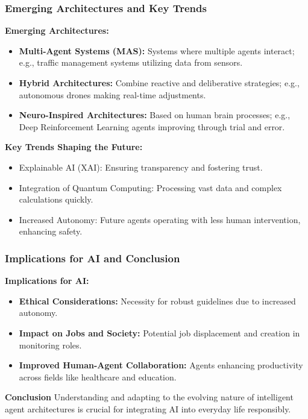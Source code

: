 \documentclass[aspectratio=169]{beamer}
\begin{document}
\begin{frame}[fragile]
    \frametitle{Emerging Architectures and Key Trends}

    \textbf{Emerging Architectures:}
    \begin{itemize}
        \item \textbf{Multi-Agent Systems (MAS):} Systems where multiple agents interact; e.g., traffic management systems utilizing data from sensors.
        \item \textbf{Hybrid Architectures:} Combine reactive and deliberative strategies; e.g., autonomous drones making real-time adjustments.
        \item \textbf{Neuro-Inspired Architectures:} Based on human brain processes; e.g., Deep Reinforcement Learning agents improving through trial and error.
    \end{itemize}
    
    \textbf{Key Trends Shaping the Future:}
    \begin{itemize}
        \item Explainable AI (XAI): Ensuring transparency and fostering trust.
        \item Integration of Quantum Computing: Processing vast data and complex calculations quickly.
        \item Increased Autonomy: Future agents operating with less human intervention, enhancing safety.
    \end{itemize}
    
\end{frame}

\begin{frame}[fragile]
    \frametitle{Implications for AI and Conclusion}

    \textbf{Implications for AI:}
    \begin{itemize}
        \item \textbf{Ethical Considerations:} Necessity for robust guidelines due to increased autonomy.
        \item \textbf{Impact on Jobs and Society:} Potential job displacement and creation in monitoring roles.
        \item \textbf{Improved Human-Agent Collaboration:} Agents enhancing productivity across fields like healthcare and education.
    \end{itemize}
    
    \textbf{Conclusion}
    Understanding and adapting to the evolving nature of intelligent agent architectures is crucial for integrating AI into everyday life responsibly.
    
\end{frame}
\end{document}

